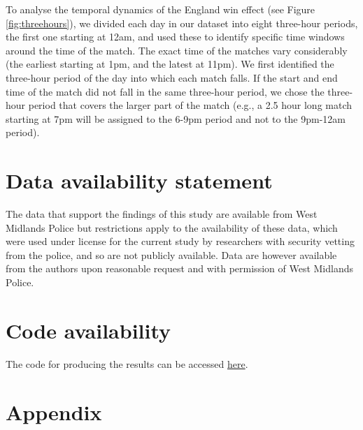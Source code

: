 \documentclass[12pt, letterpaper]{article}
\begin{document}
{ To analyse the temporal dynamics of the England win effect (see Figure \ref{fig:threehours}), we divided each day in our dataset into eight three-hour periods, the first one starting at 12am, and used these to identify specific time windows around the time of the match. The exact time of the matches vary considerably (the earliest starting at 1pm, and the latest at 11pm). We first identified the three-hour period of the day into which each match falls. If the start and end time of the match did not fall in the same three-hour period, we chose the three-hour period that covers the larger part of the match (e.g., a 2.5 hour long match starting at 7pm will be assigned to the 6-9pm period and not to the 9pm-12am period).


\section*{Data availability statement}

The data that support the findings of this study are available from West Midlands Police
but restrictions apply to the availability of these data, which were used under license
for the current study by researchers with security vetting from the police, and so are not publicly available. Data are however available from the authors upon reasonable request and with permission of West Midlands Police.

\section*{Code availability}

The code for producing the results can be accessed \href{https://osf.io/kg9yr/?view_only=172a33b467bd4566b2e5dea0e2f59f8c}{here}. 

\section*{Appendix}

\renewcommand{\thetable}{A\arabic{table}}
\renewcommand{\thefigure}{A\arabic{figure}}
\setcounter{table}{0}
\setcounter{figure}{0}

}
\end{document}

